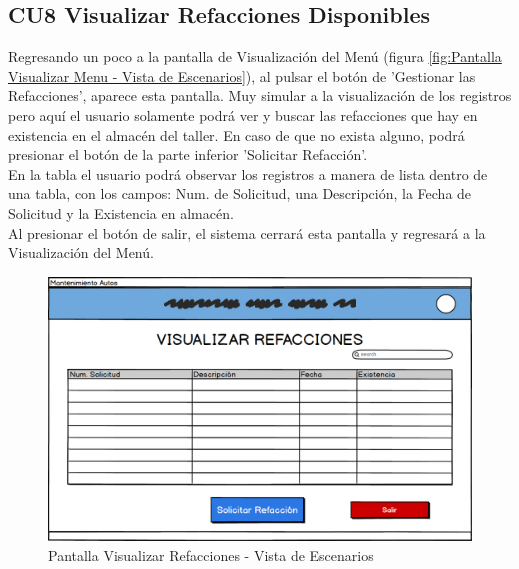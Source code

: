 \subsection{CU8 Visualizar Refacciones Disponibles}
Regresando un poco a la pantalla de Visualización del Menú (figura \ref{fig:Pantalla Visualizar Menu - Vista de Escenarios}), al pulsar el botón de 'Gestionar las Refacciones', aparece esta pantalla. Muy simular a la visualización de los registros pero aquí el usuario solamente podrá ver y buscar las refacciones que hay en existencia en el almacén del taller. En caso de que no exista alguno, podrá presionar el botón de la parte inferior 'Solicitar Refacción'.
\\
En la tabla el usuario podrá observar los registros a manera de lista dentro de una tabla, con los campos: Num. de Solicitud, una Descripción, la Fecha de Solicitud y la Existencia en almacén. 
\\
Al presionar el botón de salir, el sistema cerrará esta pantalla y regresará a la Visualización del Menú. 
\begin{figure}[!h]
	\centering
	\includegraphics[width=1\textwidth]{./diseno/vescenarios/imagenes/VisualizarRefacciones}
	\caption{Pantalla Visualizar Refacciones - Vista de Escenarios}
	\label{fig:Pantalla Visualizar Refaccioes - Vista de Escenarios}
\end{figure}
\clearpage